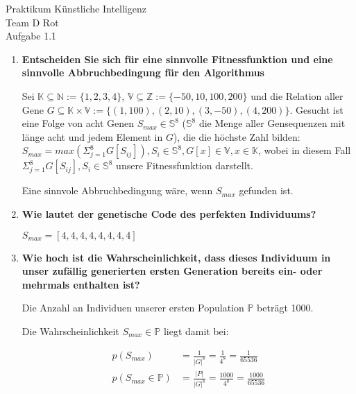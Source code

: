 \documentclass[12pt, twoside]{article}
\begin{document}
\begin{center}
  \Huge{Praktikum K\"unstliche Intelligenz} \\
  \huge{Team D Rot} \\
  \Large{Aufgabe 1.1} \\
\end{center}

\begin{enumerate}[label={\textbf{\alph*)}}]

  \item \textbf{Entscheiden Sie sich f\"ur eine sinnvolle
          Fitnessfunktion und eine sinnvolle
          Abbruchbedingung f\"ur den Algorithmus}

        Sei $\mathbb{K} \subseteq \mathbb{N}:=\{1,2,3,4\}$,
        $\mathbb{V} \subseteq \mathbb{Z} := \{-50,10,100,
        200\}$ und die Relation aller Gene $G \subseteq
        \mathbb{K} \times \mathbb{V} := \{(1,100), (2,10),
        (3, -50),(4, 200)\}$. Gesucht ist eine Folge von
        acht Genen $S_{max} \in \mathbb{S}^8$
        ($\mathbb{S}^8$ die Menge aller Gensequenzen mit
        l\"ange acht und jedem Element in $G$), die die
        h\"ochste Zahl bilden:
        $S_{max} = max(\Sigma_{j=1}^{8} G[S_{ij}]), S_{i}
        \in \mathbb{S}^8, G[x] \in \mathbb{V}, x \in
        \mathbb{K}$,
        wobei in diesem Fall
        $\Sigma_{j=1}^{8} G[S_{ij}],S_{i} \in \mathbb{S}^8$
        unsere Fitnessfunktion darstellt.

        Eine sinnvole Abbruchbedingung w\"are, wenn
        $S_{max}$ gefunden ist.

  \item \textbf{Wie lautet der genetische Code des
          perfekten Individuums?}

        $S_{max} = [4, 4, 4, 4, 4, 4, 4, 4]$

  \item \textbf{Wie hoch ist die Wahrscheinlichkeit, dass
          dieses Individuum in unser zuf\"allig generierten
          ersten Generation bereits ein- oder mehrmals
          enthalten ist?}

        Die Anzahl an Individuen unserer ersten Population
        $\mathbb{P}$ betr\"agt 1000.

        Die Wahrscheinlichkeit $S_{max} \in \mathbb{P}$
        liegt damit bei:

        \begin{align*}
          p(S_{max}) &= \frac{1}{|G|^{8}} = \frac{1}{4^8}
                     = \frac{1}{65536} \\
          p(S_{max} \in \mathbb{P}) &= \frac{|P|}{|G|^{8}}
                     =\frac{1000}{4^8} = \frac{1000}{65536}
        \end{align*}


\end{enumerate}
\end{document}
